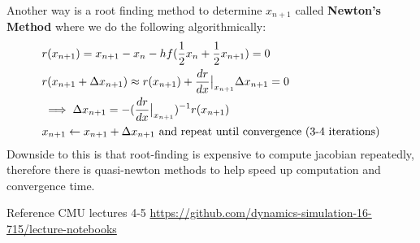 \documentclass{article}
\begin{document}
Another way is a root finding method to determine $x_{n+1}$ called \textbf{Newton's Method} where we do the following algorithmically:
\begin{align}
    & r(x_{n+1}) = x_{n+1} - x_{n} - h f(\frac{1}{2}x_n + \frac{1}{2}x_{n+1}) = 0 \notag \\
    & r(x_{n+1} + \Delta x_{n+1}) \approx r(x_{n+1}) + \frac{dr}{dx}\big|_{x_{n+1}} \Delta x_{n+1} = 0 \notag \\
    & \implies \Delta x_{n+1} = -(\frac{dr}{dx}\big|_{x_{n+1}})^{-1} r(x_{n+1}) \notag \\
    & x_{n+1}\leftarrow x_{n+1} + \Delta x_{n+1} \text{ and repeat until convergence (3-4 iterations)}
\end{align}
Downside to this is that root-finding is expensive to compute jacobian repeatedly, therefore there is quasi-newton methods to help speed up computation and convergence time.

Reference CMU lectures 4-5 \url{https://github.com/dynamics-simulation-16-715/lecture-notebooks}
\end{document}
